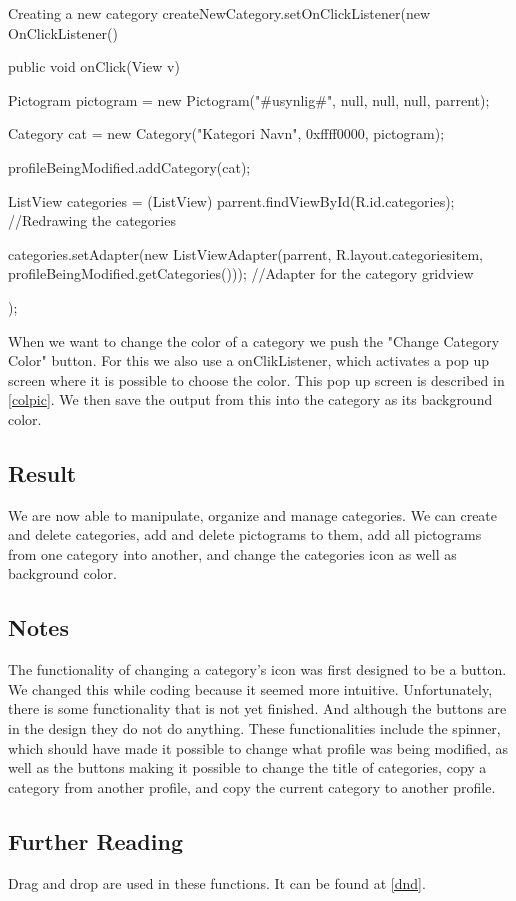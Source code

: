 \begin{source}[{mc6}]{Creating a new category}
createNewCategory.setOnClickListener(new OnClickListener() 
		{
			public void onClick(View v) 
			{
				Pictogram pictogram = new Pictogram("#usynlig#", null, null, null, parrent);
				
				Category cat = new Category("Kategori Navn", 0xffff0000, pictogram);
				
				profileBeingModified.addCategory(cat);
				
				ListView categories = (ListView) parrent.findViewById(R.id.categories); //Redrawing the categories
				
				categories.setAdapter(new ListViewAdapter(parrent, R.layout.categoriesitem, profileBeingModified.getCategories())); 
				//Adapter for the category gridview
			}
		});
\end{source}
When we want to change the color of a category we push the "Change Category Color" button. 
For this we also use a onClikListener, which activates a pop up screen where it is possible to choose the color. This pop up screen is described in \autoref{colpic}.
We then save the output from this into the category as its background color. 

\subsection*{Result}
We are now able to manipulate, organize and manage categories. We can create and delete categories,
add and delete pictograms to them, add all pictograms from one category into another, and 
change the categories icon as well as background color.


\subsection*{Notes}
The functionality of changing a category's icon was first designed to be a button. We changed this while coding because it seemed more intuitive.\newline 
Unfortunately, there is some functionality that is not yet finished. And although the buttons are in the design they do not do anything. 
These functionalities include the spinner, which should have made it possible to change what profile was being modified, as well as the buttons making it possible to change the title of categories, copy a category from another profile, and copy the current category to another profile. 


\subsection*{Further Reading}
Drag and drop are used in these functions. It can be found at \autoref{dnd}.